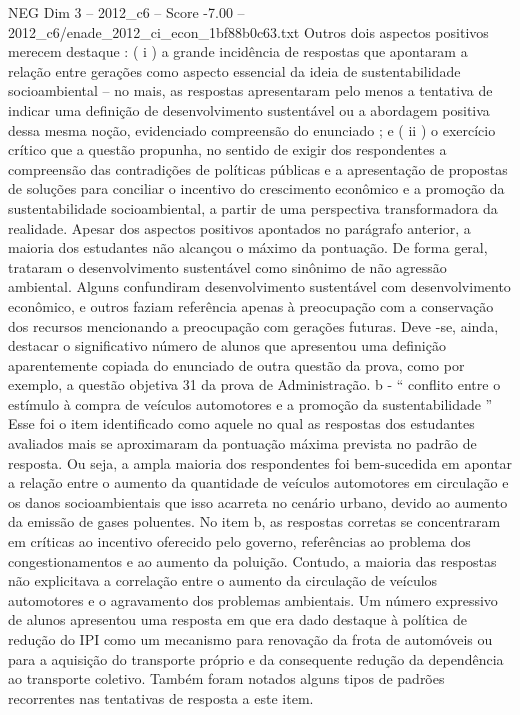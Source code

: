 \begin{textsample}{NEG Dim 3 – 2012\_c6 – Score -7.00 – 2012\_c6/enade\_2012\_ci\_econ\_1bf88b0c63.txt}
Outros dois aspectos positivos merecem destaque : ( i ) a grande incidência de respostas que apontaram a relação entre gerações como aspecto essencial da ideia de sustentabilidade socioambiental – no mais, as respostas apresentaram pelo menos a tentativa de indicar uma definição de desenvolvimento sustentável ou a abordagem positiva dessa mesma noção, evidenciado compreensão do enunciado ; e ( ii ) o exercício crítico que a questão propunha, no sentido de exigir dos respondentes a compreensão das contradições de políticas públicas e a apresentação de propostas de soluções para conciliar o incentivo do crescimento econômico e a promoção da sustentabilidade socioambiental, a partir de uma perspectiva transformadora da realidade.
Apesar dos aspectos positivos apontados no parágrafo anterior, a maioria dos estudantes não alcançou o máximo da pontuação.
De forma geral, trataram o desenvolvimento sustentável como sinônimo de não agressão ambiental.
Alguns confundiram desenvolvimento sustentável com desenvolvimento econômico, e outros faziam referência apenas à preocupação com a conservação dos recursos mencionando a preocupação com gerações futuras.
Deve -se, ainda, destacar o significativo número de alunos que apresentou uma definição aparentemente copiada do enunciado de outra questão da prova, como por exemplo, a questão objetiva 31 da prova de Administração. b - “ conflito entre o estímulo à compra de veículos automotores e a promoção da sustentabilidade ” Esse foi o item identificado como aquele no qual as respostas dos estudantes avaliados mais se aproximaram da pontuação máxima prevista no padrão de resposta.
Ou seja, a ampla maioria dos respondentes foi bem-sucedida em apontar a relação entre o aumento da quantidade de veículos automotores em circulação e os danos socioambientais que isso acarreta no cenário urbano, devido ao aumento da emissão de gases poluentes.
No item b, as respostas corretas se concentraram em críticas ao incentivo oferecido pelo governo, referências ao problema dos congestionamentos e ao aumento da poluição.
Contudo, a maioria das respostas não explicitava a correlação entre o aumento da circulação de veículos automotores e o agravamento dos problemas ambientais.
Um número expressivo de alunos apresentou uma resposta em que era dado destaque à política de redução do IPI como um mecanismo para renovação da frota de automóveis ou para a aquisição do transporte próprio e da consequente redução da dependência ao transporte coletivo.
Também foram notados alguns tipos de padrões recorrentes nas tentativas de resposta a este item.

\end{textsample}
